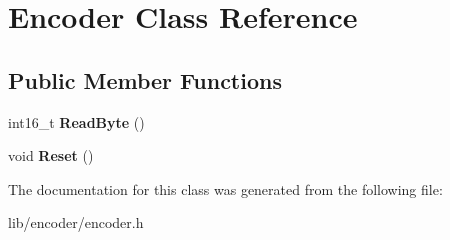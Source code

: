 \hypertarget{class_encoder}{}\section{Encoder Class Reference}
\label{class_encoder}
\subsection*{Public Member Functions}
\begin{DoxyCompactItemize}
\item 
\hypertarget{class_encoder_a197bd59521ad491bb5c0a9e6d473433c}{}\label{class_encoder_a197bd59521ad491bb5c0a9e6d473433c} 
int16\+\_\+t {\bfseries Read\+Byte} ()
\item 
\hypertarget{class_encoder_a4375bf4d88d56f5f5d09860f9062d691}{}\label{class_encoder_a4375bf4d88d56f5f5d09860f9062d691} 
void {\bfseries Reset} ()
\end{DoxyCompactItemize}


The documentation for this class was generated from the following file\+:\begin{DoxyCompactItemize}
\item 
lib/encoder/encoder.\+h\end{DoxyCompactItemize}

